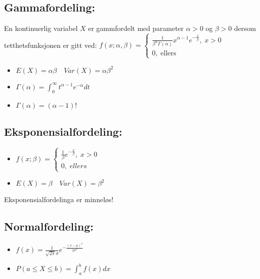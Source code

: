 \documentclass[12pt,a4paper,twocolumn,twoside]{article}
\def\forvar#1#2#3{E(#1)=#2 \quad Var(#1)=#3}
\begin{document}
\subsection*{Gammafordeling:}
En kontinuerlig variabel $X$ er gammfordelt med parameter $\alpha>0$ og $\beta>0$
dersom tetthetsfunksjonen er gitt ved:
$f(x;\alpha,\beta) = \begin{cases}
    \frac{1}{\beta^\alpha \Gamma(\alpha)} x^{\alpha-1} e^{-\frac{x}{\beta}},\; x>0\\
    0,\;\text{ellers}
\end{cases}$
\begin{itemize}[topsep=0pt,itemsep=0pt, partopsep=0pt]
    \item $E(X)=\alpha\beta \quad Var(X)=\alpha\beta^2$
    \item $\Gamma(\alpha)=\int_0^\infty t^{\alpha-1}e^{-\alpha}dt$
    \item $\Gamma(\alpha)=(\alpha-1)!$
\end{itemize}  
%
%
\subsection*{Eksponensialfordeling:}
\begin{itemize}[topsep=0pt,itemsep=0pt, partopsep=0pt]
    \item $f(x;\beta)=\begin{cases}
        \frac{1}{\beta}e^{-\frac{x}{\beta}},\;x>0\\
        0,\;ellers
    \end{cases}$
    \item $\forvar{X}{\beta}{\beta^2}$
\end{itemize}
Eksponensialfordelinga er minneløs!
%
%
\subsection*{Normalfordeling:}
\begin{itemize}[topsep=0pt,itemsep=0pt, partopsep=0pt]
    \item $f(x)=\frac{1}{\sqrt{2\pi}\sigma}e^{-\frac{(x-\mu)^2}{2\sigma^2}}$
    \item $P(a\leq X \leq b) = \int_a^b f(x)dx$
\end{itemize}
\end{document}
